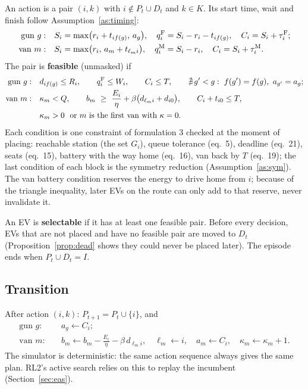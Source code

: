An action is a pair $(i,k)$ with $i\notin P_t\cup D_t$ and $k\in K$. Its start time, wait and finish follow Assumption~\ref{as:timing}:
\begin{align*}
\text{gun } g:&\quad S_i=\max\!\big(r_i+t_{if(g)},\,a_g\big),\quad q^{\mathrm{F}}_i=S_i-r_i-t_{if(g)},\quad C_i=S_i+\tau^{\mathrm{F}}_i;\\
\text{van } m:&\quad S_i=\max\!\big(r_i,\,a_m+t_{\ell_m i}\big),\quad q^{\mathrm{M}}_i=S_i-r_i,\quad C_i=S_i+\tau^{\mathrm{M}}_i .
\end{align*}
The pair is \textbf{feasible} (unmasked) if
\begin{align*}
\text{gun } g:&\quad d_{if(g)}\le R_i,\qquad q^\Fcs_i\le W_i,\qquad C_i\le T,\qquad \nexists\,g'<g:\ f(g')=f(g),\ a_{g'}=a_g;\\
\text{van } m:&\quad \kappa_m<Q,\qquad b_m\ \ge\ \frac{E_i}{\eta}+\beta\big(d_{\ell_m i}+d_{i0}\big),\qquad C_i+t_{i0}\le T,\\
&\quad \kappa_m>0\ \text{ or } m \text{ is the first van with } \kappa=0 .
\end{align*}
Each condition is one constraint of formulation 3 checked at the moment of placing: reachable station (the set $G_i$), queue tolerance (eq.\ 5), deadline (eq.\ 21), seats (eq.\ 15), battery with the way home (eq.\ 16), van back by $T$ (eq.\ 19); the last condition of each block is the symmetry reduction (Assumption~\ref{as:sym}). The van battery condition reserves the energy to drive home from $i$; because of the triangle inequality, later EVs on the route can only add to that reserve, never invalidate it.

An EV is \textbf{selectable} if it has at least one feasible pair. Before every decision, EVs that are not placed and have no feasible pair are moved to $D_t$ (Proposition~\ref{prop:dead} shows they could never be placed later). The episode ends when $P_t\cup D_t=I$.

\subsection{Transition}

After action $(i,k)$: $P_{t+1}=P_t\cup\{i\}$, and
\begin{align*}
\text{gun } g:&\quad a_g\leftarrow C_i;\\
\text{van } m:&\quad b_m\leftarrow b_m-\frac{E_i}{\eta}-\beta\,d_{\ell_m i},\quad \ell_m\leftarrow i,\quad a_m\leftarrow C_i,\quad \kappa_m\leftarrow\kappa_m+1 .
\end{align*}
The simulator is deterministic: the same action sequence always gives the same plan. RL2's active search relies on this to replay the incumbent (Section~\ref{sec:eas}).

